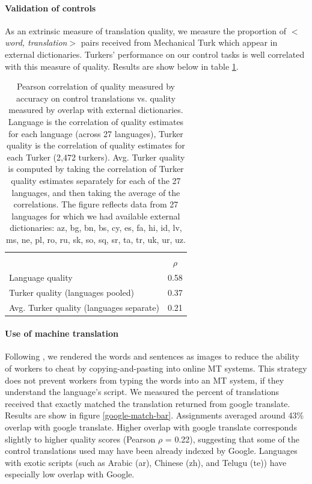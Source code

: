 \documentclass[11pt]{article}
\begin{document}
\paragraph{Validation of controls} As an extrinsic measure of translation quality, we measure the proportion of $<${\it word, translation}$>$ pairs received from Mechanical Turk which appear in external dictionaries. Turkers' performance on our control tasks is well correlated with this measure of quality. Results are show below in table \ref{corr-table}. 

\begin{table}[h]
\centering
\begin{tabular}{lc}\hline\hline\\
&$\rho$\\
Language quality&0.58\\
Turker quality (languages pooled)&0.37\\
Avg. Turker quality (languages separate)&0.21\\
\hline\hline
\end{tabular}
\caption{Pearson correlation of quality measured by accuracy on control translations vs. quality measured by overlap with external dictionaries. Language is the correlation of quality estimates for each language (across 27 languages), Turker quality is the correlation of quality estimates for each Turker (2,472 turkers). Avg. Turker quality is computed by taking the correlation of Turker quality estimates separately for each of the 27 languages, and then taking the average of the correlations. The figure reflects data from 27 languages for which we had available external dictionaries: az, bg, bn, bs, cy, es, fa, hi, id, lv, ms, ne, pl, ro, ru, sk, so, sq, sr, ta, tr, uk, ur, uz.}
\label{corr-table}
\end{table}

\paragraph{Use of machine translation}
Following , we rendered the words and sentences as images to reduce the ability of workers to cheat by copying-and-pasting into online MT systems.  This strategy does not prevent workers from typing the words into an MT system, if they understand the language's script. We measured the percent of translations received that exactly matched the translation returned from google translate. Results are show in figure \ref{google-match-bar}. Assignments averaged around 43\% overlap with google translate. Higher overlap with google translate corresponds slightly to higher quality scores (Pearson $\rho$ = 0.22), suggesting that some of the control translations used may have been already indexed by Google. Languages with exotic scripts (such as Arabic (ar), Chinese (zh), and Telugu (te)) have especially low overlap with Google. 
\end{document}

